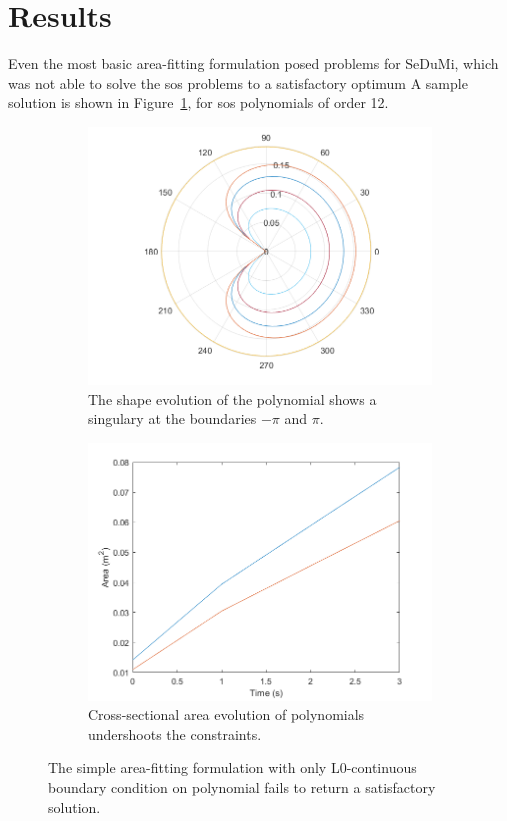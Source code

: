 \section{Results}

Even the most basic area-fitting formulation posed problems for SeDuMi,
which was not able to solve the \gls{sos} problems to a satisfactory optimum
A sample solution is shown in Figure~\ref{fig:sampleSol}, for \gls{sos}
polynomials of order 12.

\begin{figure}
    \begin{subfigure}{0.48\textwidth}
        \includegraphics[width = 0.9\linewidth]{figures/sampleSol.png}
    \caption{The shape evolution of the polynomial shows a singulary at the boundaries $-\pi$ and $\pi$.}
        \label{fig:sampleSol}
    \end{subfigure}
    \begin{subfigure}{0.48\textwidth}
        \includegraphics[width = 0.9\linewidth]{figures/sampleA.png}
        \caption{Cross-sectional area evolution of polynomials undershoots the constraints.}
        \label{fig:sampleA}
    \end{subfigure}
    \caption{The simple area-fitting formulation with only L0-continuous boundary condition
    on polynomial fails to return a satisfactory solution.}
    \label{fig:sampleSolandA}
\end{figure}

